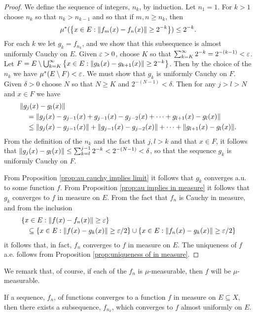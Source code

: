 \begin{proof}
We define the sequence of integers, $n_k$, by induction. Let $n_1=1$. For $k>1$ choose $n_k$ so that $n_k>n_{k-1}$ and so that if $m,n \geq n_k$, then $$\mu^*(\left\{x\in E:\norm{f_m(x)-f_n(x)}\geq2^{-k}\right\})\leq 2^{-k}.$$ For each $k$ we let $g_k=f_{n_k}$, and we show that this subsequence is almost uniformly Cauchy on $E$. Given $\varepsilon>0$, choose $K$ so that $\sum_{k=K}^\infty 2^{-k}=2^{-(k-1)}<\varepsilon$. Let $F=E\setminus\bigcup_{k=K}^\infty\left\{x \in E:\norm{g_k(x)-g_{k+1}(x)}\geq2^{-k}\right\}$. Then by the choice of the $n_k$ we have $\mu^*(E\setminus F)<\varepsilon$. We must show that $g_k$ is uniformly Cauchy on $F$. Given $\delta>0$ choose $N$ so that $N \geq K$ and $2^{-(N-1)}<\delta$. Then for any $j>l>N$ and $x \in F$ we have
\begin{align*}
&\norm{g_j(x)-g_l(x)} \\
&\quad=\norm{g_j(x)-g_{j-1}(x)+g_{j-1}(x)-g_{j-2}(x)+\dots+g_{l+1}(x)-g_l(x)} \\
&\quad\leq\norm{g_j(x)-g_{j-1}(x)}+\norm{g_{j-1}(x)-g_{j-2}(x)}+\dots+\norm{g_{l+1}(x)-g_l(x)}.
\end{align*}
From the definition of the $n_k$ and the fact that $j, l>k$ and that $x \in F$, it follows that $\norm{g_j(x)-g_l(x)} \leq \sum_{k=l}^{j-1} 2^{-k}<2^{-(N-1)}<\delta$, so that the sequence $g_k$ is uniformly Cauchy on $F$.

From Proposition \ref{prop:au cauchy implies limit} it follows that $g_k$ converges a.u. to some function $f$. From Proposition \ref{prop:au implies in measure} it follows that $g_k$ converges to $f$ in measure on $E$. From the fact that $f_n$ is Cauchy in measure, and from the inclusion
\begin{align*}
&\left\{x \in E:\norm{f(x)-f_n(x)} \geq \varepsilon\right\}\\
&\quad\subseteq\left\{x\in E:\norm{f(x)-g_k(x)}\geq\varepsilon/2\right\}\cup\left\{x\in E:\norm{f_n(x)-g_k(x)}\geq\varepsilon/2\right\}
\end{align*}
it follows that, in fact, $f_n$ converges to $f$ in measure on $E$. The uniqueness of $f$ a.e. follows from Proposition \ref{prop:uniqueness of in measure}.
\end{proof}

We remark that, of course, if each of the $f_n$ is $\mu$-measurable, then $f$ will be $\mu$-measurable.

\begin{corollary}
\label{cor:in measure implies subsequence ae}
If a sequence, $f_n$, of functions converges to a function $f$ in measure on $E \subseteq X$, then there exists a subsequence, $f_{n_k}$, which converges to $f$ almost uniformly on $E$.
\end{corollary}

